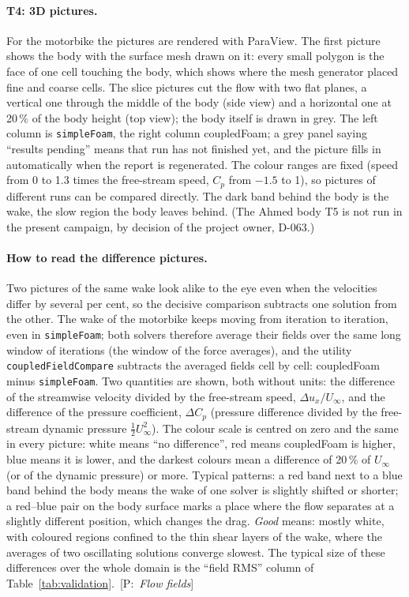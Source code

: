 \documentclass[11pt,a4paper]{article}
\newcommand{\code}[1]{\texttt{#1}}
\newcommand{\pro}[1]{\ {\small[P:~\textit{#1}]}}
\begin{document}
\clearpage
\paragraph{T4: 3D pictures.} For the motorbike the pictures are rendered
with ParaView. The first picture shows the body with the surface mesh drawn
on it: every small polygon is the face of one cell touching the body, which
shows where the mesh generator placed fine and coarse cells. The slice
pictures cut the flow with two flat planes, a vertical one through the
middle of the body (side view) and a horizontal one at 20\,\% of the body
height (top view); the body itself is drawn in grey. The left column is
\code{simpleFoam}, the right column coupledFoam; a grey panel saying
``results pending'' means that run has not finished yet, and the picture
fills in automatically when the report is regenerated. The colour ranges
are fixed (speed from 0 to 1.3 times the free-stream speed, $C_p$ from
$-1.5$ to 1), so pictures of different runs can be compared directly. The
dark band behind the body is the wake, the slow region the body leaves
behind. (The Ahmed body T5 is not run in the present campaign, by decision
of the project owner, D-063.)

\paragraph{How to read the difference pictures.} Two pictures of the same
wake look alike to the eye even when the velocities differ by several per
cent, so the decisive comparison subtracts one solution from the other. The
wake of the motorbike keeps moving from iteration to iteration, even in
\code{simpleFoam}; both solvers therefore average their fields over the
same long window of iterations (the window of the force averages), and the
utility \code{coupledFieldCompare} subtracts the averaged fields cell by
cell: coupledFoam minus \code{simpleFoam}. Two quantities are shown, both
without units: the difference of the streamwise velocity divided by the
free-stream speed, $\Delta u_x/U_\infty$, and the difference of the pressure
coefficient, $\Delta C_p$ (pressure difference divided by the free-stream
dynamic pressure $\tfrac12U_\infty^2$). The colour scale is centred on zero
and the same in every picture: white means ``no difference'', red means
coupledFoam is higher, blue means it is lower, and the darkest colours mean
a difference of 20\,\% of $U_\infty$ (or of the dynamic pressure) or more.
Typical patterns: a red band next to a blue band behind the body means the
wake of one solver is slightly shifted or shorter; a red--blue pair on the
body surface marks a place where the flow separates at a slightly different
position, which changes the drag. \emph{Good} means: mostly white, with
coloured regions confined to the thin shear layers of the wake, where the
averages of two oscillating solutions converge slowest. The typical size of
these differences over the whole domain is the ``field RMS'' column of
Table~\ref{tab:validation}.\pro{Flow fields}
\end{document}

